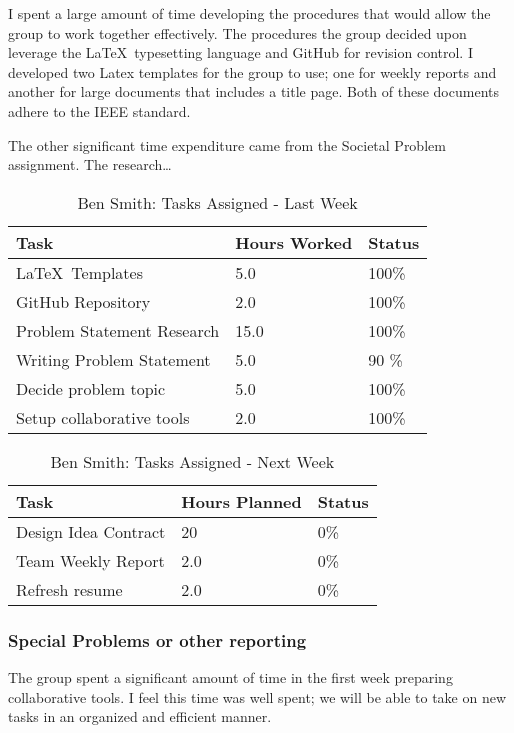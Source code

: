 \documentclass[12pt,article,compsoc]{IEEEtran}
\begin{document}
	I spent a large amount of time developing the procedures that would allow the group to work together effectively. 
	The procedures the group decided upon leverage the \LaTeX\ typesetting language and GitHub for revision control.
	 I developed two Latex templates for the group to use; one for weekly reports and another for large documents that
	 includes a title page. Both of these documents adhere to the IEEE standard. 
	
	The other significant time expenditure came from the Societal Problem assignment. The research…

	\begin{table}[ht]
	\renewcommand{\arraystretch}{1.3}
		\caption{Ben Smith: Tasks Assigned - Last Week}
		
		\label{Summary of Ben Smith's activities: last week}
		
		\centering
		\begin{tabular}{p{5.5cm}|p{1cm}|p{1cm}}

		\hline
		\bfseries 		Task							& \bfseries Hours Worked		& \bfseries Status		\\
		\hline\hline
					\LaTeX\ Templates				& 5.0						& 100\%				\\	%
					GitHub Repository				& 2.0						& 100\%				\\	
					Problem Statement Research		& 15.0					& 100\%				\\
					Writing Problem Statement		& 5.0						& 90 \%				\\
					Decide problem topic			& 5.0						& 100\%				\\
					Setup collaborative tools			& 2.0						& 100\%				\\
		\hline
		\end{tabular}
	\end{table}

	\begin{table}[ht]
	\renewcommand{\arraystretch}{1.3}
		\caption{Ben Smith: Tasks Assigned - Next Week}
		
		\label{Summary of Ben Smith's activites: this week}
		
		\centering
		\begin{tabular}{p{5.5cm}|p{1cm}|p{1cm}}

		\hline
		\bfseries 		Task		 				& \bfseries Hours Planned		& \bfseries Status		\\
		\hline\hline
					Design Idea Contract			& 20						& 0\%				\\	%
					Team Weekly Report			& 2.0						& 0\%				\\	
					Refresh resume 			& 2.0						& 0\%				\\
		\hline
		\end{tabular}
	\end{table}

	\subsubsection*{Special Problems or other reporting}
	The group spent a significant amount of time in the first week preparing collaborative tools. I feel this time was well spent; 
	we will be able to take on new tasks in an organized and efficient manner. 	
	
\end{document}
